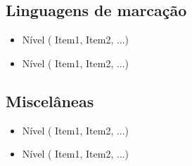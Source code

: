 \documentclass[a4paper,12pt]{memoir} %
\begin{document}
\subsection*{Linguagens de marcação}

\begin{itemize}
	\item Nível ( Item1, Item2, ...)
	\item Nível ( Item1, Item2, ...)
\end{itemize}

\subsection*{Miscelâneas}

\begin{itemize}
	\item Nível ( Item1, Item2, ...)
	\item Nível ( Item1, Item2, ...)
\end{itemize}

\end{document}
